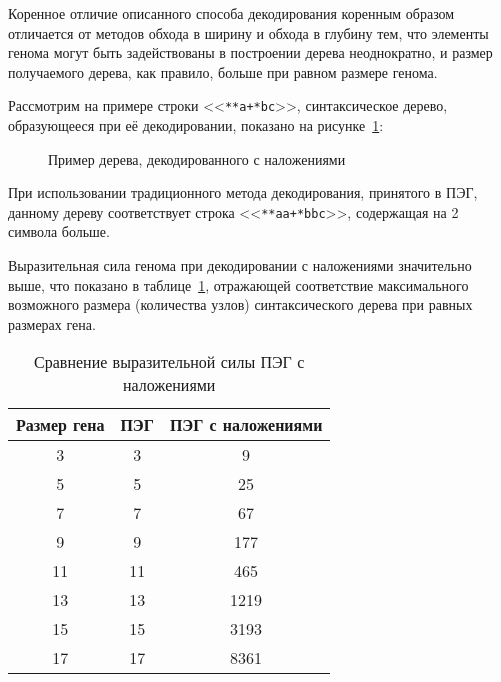 Коренное отличие описанного способа декодирования коренным образом отличается от методов обхода в ширину и обхода в глубину тем, что элементы генома могут быть задействованы в построении дерева неоднократно, и размер получаемого дерева, как правило, больше при равном размере генома.

Рассмотрим на примере строки <<\verb|**a+*bc|>>, синтаксическое дерево, образующееся при её декодировании, показано на рисунке~\ref{img:GEP_ET_sample_EAOGE}:

\begin{figure} [h]
  \center
  \caption{Пример дерева, декодированного с наложениями}
  \label{img:GEP_ET_sample_EAOGE}
\end{figure}

При использовании традиционного метода декодирования, принятого в ПЭГ, данному дереву соответствует строка <<\verb|**aa+*bbc|>>, содержащая на 2 символа больше.

Выразительная сила генома при декодировании с наложениями значительно выше, что показано в таблице~\ref{tbl:EAOGE_expression_power}, отражающей соответствие максимального возможного размера (количества узлов) синтаксического дерева при равных размерах гена.

\begin{table}[h]
  \caption{Сравнение выразительной силы ПЭГ с наложениями}
  \label{tbl:EAOGE_expression_power}
  \begin{center}
    \begin{tabular}{|c|c|c|}
      \hline
      Размер гена & ПЭГ & ПЭГ с наложениями \\
      \hline
      3 & 3 & 9 \\
      5 & 5 & 25 \\
      7 & 7 & 67 \\
      9 & 9 & 177 \\
      11 & 11 & 465 \\
      13 & 13 & 1219 \\
      15 & 15 & 3193 \\
      17 & 17 & 8361 \\
      \hline
    \end{tabular}
  \end{center}
\end{table}


